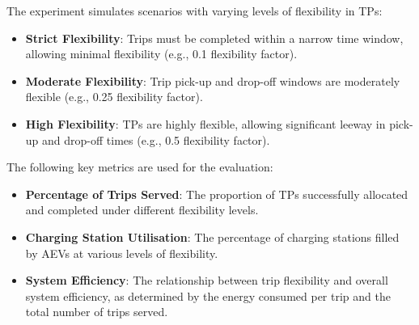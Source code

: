 The experiment simulates scenarios with varying levels of flexibility in TPs:
\begin{itemize}
    \item \textbf{Strict Flexibility}: Trips must be completed within a narrow time window, allowing minimal flexibility (e.g., 0.1 flexibility factor).
    \item \textbf{Moderate Flexibility}: Trip pick-up and drop-off windows are moderately flexible (e.g., 0.25 flexibility factor).
    \item \textbf{High Flexibility}: TPs are highly flexible, allowing significant leeway in pick-up and drop-off times (e.g., 0.5 flexibility factor).
\end{itemize}

The following key metrics are used for the evaluation:
\begin{itemize}
    \item \textbf{Percentage of Trips Served}: The proportion of TPs successfully allocated and completed under different flexibility levels.
    \item \textbf{Charging Station Utilisation}: The percentage of charging stations filled by AEVs at various levels of flexibility.
    \item \textbf{System Efficiency}: The relationship between trip flexibility and overall system efficiency, as determined by the energy consumed per trip and the total number of trips served.
\end{itemize}



